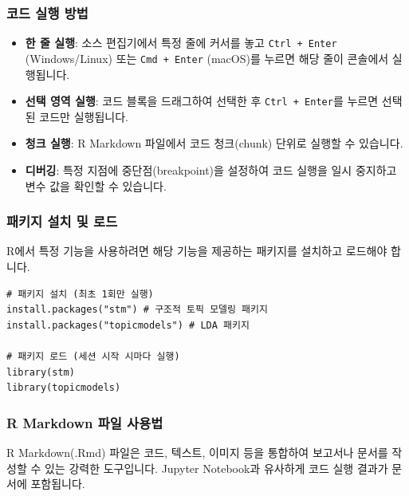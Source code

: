 \documentclass[11pt,a4paper]{article}
\begin{document}
\subsubsection*{코드 실행 방법}
\begin{itemize}
    \item \textbf{한 줄 실행}: 소스 편집기에서 특정 줄에 커서를 놓고 \texttt{Ctrl + Enter} (Windows/Linux) 또는 \texttt{Cmd + Enter} (macOS)를 누르면 해당 줄이 콘솔에서 실행됩니다.
    \item \textbf{선택 영역 실행}: 코드 블록을 드래그하여 선택한 후 \texttt{Ctrl + Enter}를 누르면 선택된 코드만 실행됩니다.
    \item \textbf{청크 실행}: R Markdown 파일에서 코드 청크(chunk) 단위로 실행할 수 있습니다.
    \item \textbf{디버깅}: 특정 지점에 중단점(breakpoint)을 설정하여 코드 실행을 일시 중지하고 변수 값을 확인할 수 있습니다.
\end{itemize}

\subsubsection*{패키지 설치 및 로드}
R에서 특정 기능을 사용하려면 해당 기능을 제공하는 패키지를 설치하고 로드해야 합니다.
\begin{lstlisting}[caption={R 패키지 설치 및 로드 예시}, label={lst:r_package}]
# 패키지 설치 (최초 1회만 실행)
install.packages("stm") # 구조적 토픽 모델링 패키지
install.packages("topicmodels") # LDA 패키지

# 패키지 로드 (세션 시작 시마다 실행)
library(stm)
library(topicmodels)
\end{lstlisting}

\subsubsection*{R Markdown 파일 사용법}
\begin{conceptbox}
R Markdown(.Rmd) 파일은 코드, 텍스트, 이미지 등을 통합하여 보고서나 문서를 작성할 수 있는 강력한 도구입니다.
Jupyter Notebook과 유사하게 코드 실행 결과가 문서에 포함됩니다.
\end{conceptbox}
\end{document}
